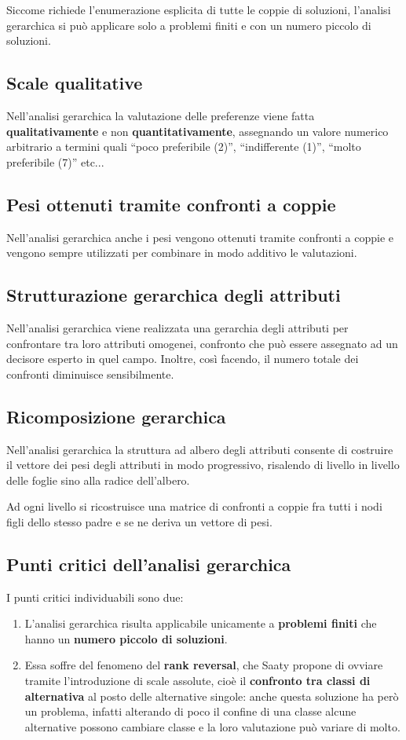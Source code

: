 \documentclass[\main/main.tex]{subfiles}
\begin{document}
Siccome richiede l'enumerazione esplicita di tutte le coppie di soluzioni, l'analisi gerarchica si può applicare solo a problemi finiti e con un numero piccolo di soluzioni.

\subsection{Scale qualitative}
Nell'analisi gerarchica la valutazione delle preferenze viene fatta \textbf{qualitativamente} e non \textbf{quantitativamente}, assegnando un valore numerico arbitrario a termini quali ``poco preferibile (2)'', ``indifferente (1)'', ``molto preferibile (7)'' etc...

\subsection{Pesi ottenuti tramite confronti a coppie}
Nell'analisi gerarchica anche i pesi vengono ottenuti tramite confronti a coppie e vengono sempre utilizzati per combinare in modo additivo le valutazioni.

\subsection{Strutturazione gerarchica degli attributi}
Nell'analisi gerarchica viene realizzata una gerarchia degli attributi per confrontare tra loro attributi omogenei, confronto che può essere assegnato ad un decisore esperto in quel campo. Inoltre, così facendo, il numero totale dei confronti diminuisce sensibilmente.

\subsection{Ricomposizione gerarchica}
Nell'analisi gerarchica la struttura ad albero degli attributi consente di costruire il vettore dei pesi degli attributi in modo progressivo, risalendo di livello in livello delle foglie sino alla radice dell'albero.

Ad ogni livello si ricostruisce una matrice di confronti a coppie fra tutti i nodi figli dello stesso padre e se ne deriva un vettore di pesi.

\subsection{Punti critici dell'analisi gerarchica}
I punti critici individuabili sono due:
\begin{enumerate}
  \item L'analisi gerarchica risulta applicabile unicamente a \textbf{problemi finiti} che hanno un \textbf{numero piccolo di soluzioni}.
  \item Essa soffre del fenomeno del \textbf{rank reversal}, che Saaty propone di ovviare tramite l'introduzione di scale assolute, cioè il \textbf{confronto tra classi di alternativa} al posto delle alternative singole: anche questa soluzione ha però un problema, infatti alterando di poco il confine di una classe alcune alternative possono cambiare classe e la loro valutazione può variare di molto.
\end{enumerate}
\end{document}
